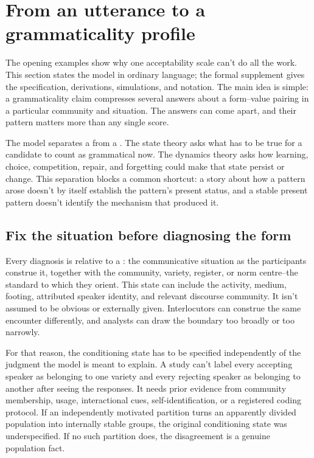 \section{From an utterance to a grammaticality profile}
\label{sec:formalism}
\label{sec:framework}

The opening examples show why one acceptability scale can't do all the work.
This section states the model in ordinary language; the formal supplement gives
the specification, derivations, simulations, and notation. The main idea is
simple: a grammaticality claim
compresses several answers about a form--value pairing in a particular
community and situation. The answers can come apart, and their pattern matters
more than any single score.

The model separates a  from a . The
state theory asks what has to be true for a candidate to count as grammatical
now. The dynamics theory asks how learning, choice, competition, repair, and
forgetting could make that state persist or change. This separation blocks a
common shortcut: a story about how a pattern arose doesn't by itself establish
the pattern's present status, and a stable present pattern doesn't identify the
mechanism that produced it.

\subsection{Fix the situation before diagnosing the form}
\label{sec:conditioning}
\label{sec:identification-c}

Every diagnosis is relative to a : the communicative
situation as the participants construe it, together with the community, variety,
register, or norm centre--the standard to which they orient. This state can include the
activity, medium, footing, attributed speaker identity, and relevant discourse
community. It isn't assumed to be obvious or externally given. Interlocutors can
construe the same encounter differently, and analysts can draw the boundary too
broadly or too narrowly.

For that reason, the conditioning state has to be specified independently of
the judgment the model is meant to explain. A study can't label every accepting
speaker as belonging to one variety and every rejecting speaker as belonging to
another after seeing the responses. It needs prior evidence from community
membership, usage, interactional cues, self-identification, or a registered
coding protocol. If an independently motivated partition turns an apparently
divided population into internally stable groups, the original conditioning
state was underspecified. If no such partition does, the disagreement is a
genuine population fact.

